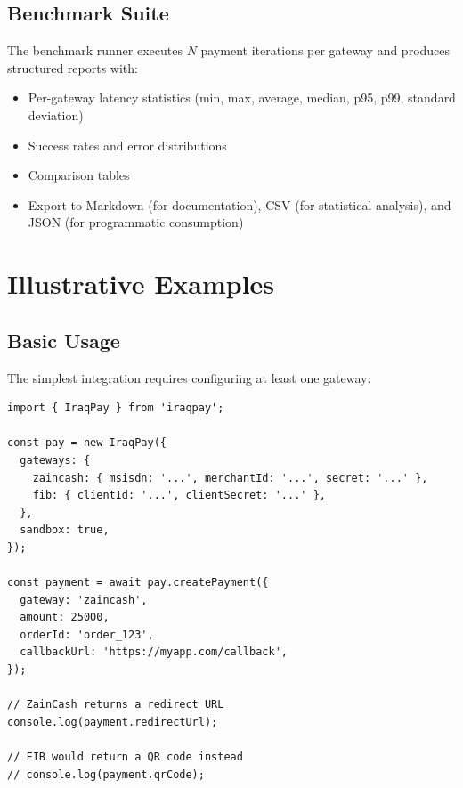\documentclass[preprint,12pt]{elsarticle}
\begin{document}
\subsection{Benchmark Suite}

The benchmark runner executes $N$ payment iterations per gateway and produces structured reports with:

\begin{itemize}
\item Per-gateway latency statistics (min, max, average, median, p95, p99, standard deviation)
\item Success rates and error distributions
\item Comparison tables
\item Export to Markdown (for documentation), CSV (for statistical analysis), and JSON (for programmatic consumption)
\end{itemize}

\section{Illustrative Examples}
\label{sec:examples}

\subsection{Basic Usage}

The simplest integration requires configuring at least one gateway:

\begin{lstlisting}[style=typescript,caption={Basic payment creation},label={lst:basic}]
import { IraqPay } from 'iraqpay';

const pay = new IraqPay({
  gateways: {
    zaincash: { msisdn: '...', merchantId: '...', secret: '...' },
    fib: { clientId: '...', clientSecret: '...' },
  },
  sandbox: true,
});

const payment = await pay.createPayment({
  gateway: 'zaincash',
  amount: 25000,
  orderId: 'order_123',
  callbackUrl: 'https://myapp.com/callback',
});

// ZainCash returns a redirect URL
console.log(payment.redirectUrl);

// FIB would return a QR code instead
// console.log(payment.qrCode);
\end{lstlisting}
\end{document}
